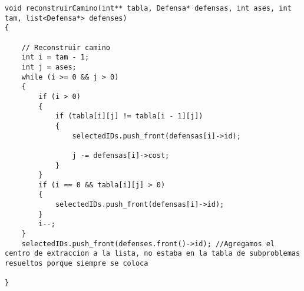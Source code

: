 \begin{lstlisting}
void reconstruirCamino(int** tabla, Defensa* defensas, int ases, int tam, list<Defensa*> defenses)
{
    
    // Reconstruir camino
    int i = tam - 1;
    int j = ases;
    while (i >= 0 && j > 0)
    {
        if (i > 0)
        {
            if (tabla[i][j] != tabla[i - 1][j])
            {
                selectedIDs.push_front(defensas[i]->id);

                j -= defensas[i]->cost;
            }
        }
        if (i == 0 && tabla[i][j] > 0)
        {
            selectedIDs.push_front(defensas[i]->id);
        }
        i--;
    }
    selectedIDs.push_front(defenses.front()->id); //Agregamos el centro de extraccion a la lista, no estaba en la tabla de subproblemas resueltos porque siempre se coloca

}

\end{lstlisting}